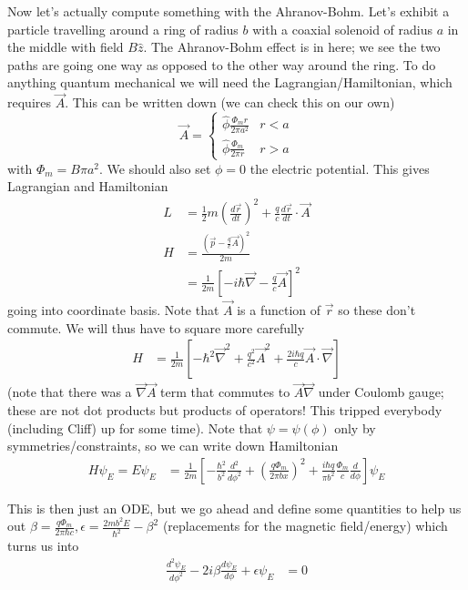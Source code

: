 \documentclass[10pt]{report}
\newcommand{\rd}[2]{\frac{d#1}{d#2}}
\newcommand{\rtd}[2]{\frac{d^2#1}{d#2^2}}
\begin{document}
Now let's actually compute something with the Ahranov-Bohm. Let's exhibit a particle travelling around a ring of radius $b$ with a coaxial solenoid of radius $a$ in the middle with field $B\hat{z}$. The Ahranov-Bohm effect is in here; we see the two paths are going one way as opposed to the other way around the ring. To do anything quantum mechanical we will need the Lagrangian/Hamiltonian, which requires $\vec{A}$. This can be written down (we can check this on our own)
\begin{equation}
    \vec{A} = 
    \begin{cases}
        \hat{\phi} \frac{\Phi_m r}{2\pi a^2} & r < a\\[10pt]
        \hat{\phi} \frac{ \Phi_m}{2\pi r} & r > a
    \end{cases}
\end{equation}
with $\Phi_m = B\pi a^2$. We should also set $\phi = 0$ the electric potential. This gives Lagrangian and Hamiltonian
\begin{align}
    L &= \frac{1}{2}m\left( \rd{\vec{r}}{t} \right)^2 + \frac{q}{c}\rd{\vec{r}}{t}\cdot\vec{A}\\
    H &= \frac{\left( \vec{p} - \frac{q}{c}\vec{A} \right)^2}{2m}\\
    &= \frac{1}{2m}\left[ -i\hbar\vec{\nabla} - \frac{q}{c}\vec{A} \right]^2
\end{align}
going into coordinate basis. Note that $\vec{A}$ is a function of $\vec{r}$ so these don't commute. We will thus have to square more carefully
\begin{align}
    H &= \frac{1}{2m}\left[ -\hbar^2 \vec{\nabla}^2 + \frac{q^2}{c^2}\vec{A}^2 + \frac{2i\hbar q}{c}\vec{A} \cdot \vec{\nabla} \right]
\end{align}
(note that there was a $\vec{\nabla} \vec{A}$ term that commutes to $\vec{A} \vec{\nabla}$ under Coulomb gauge; these are not dot products but products of operators! This tripped everybody (including Cliff) up for some time). Note that $\psi = \psi(\phi)$ only by symmetries/constraints, so we can write down Hamiltonian
\begin{align}
    H \psi_E = E\psi_E &= \frac{1}{2m}\left[ -\frac{\hbar^2}{b^2}\rtd{}{\phi} + \left(\frac{q\Phi_m}{2\pi b x}\right)^2 + \frac{i\hbar q}{\pi b^2}\frac{\Phi_m}{c}\rd{}{\phi} \right]\psi_E
\end{align}

This is then just an ODE, but we go ahead and define some quantities to help us out $\beta = \frac{q \Phi_m}{2\pi \hbar c}, \epsilon = \frac{2mb^2E}{\hbar^2} - \beta^2$ (replacements for the magnetic field/energy) which turns us into
\begin{align}
    \rtd{\psi_E}{\phi} - 2i\beta \rd{\psi_E}{\phi} + \epsilon\psi_E &= 0
\end{align}
\end{document}
